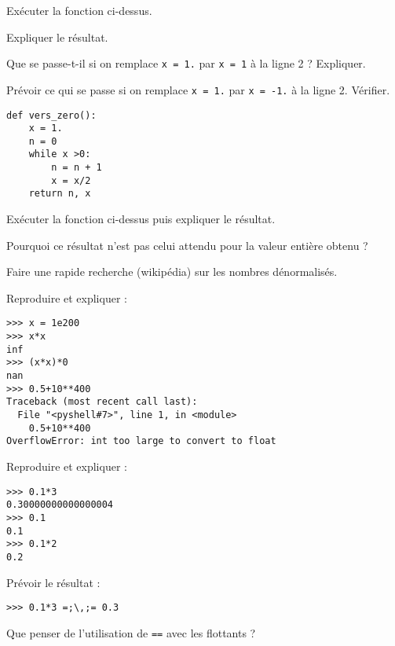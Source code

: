 Exécuter la fonction ci-dessus.

Expliquer le résultat.

Que se passe-t-il si on remplace \verb+x = 1.+ par \verb+x = 1+ à la ligne 2 ? Expliquer.

Prévoir ce qui se passe si on remplace \verb+x = 1.+ par \verb+x = -1.+ à la ligne 2. Vérifier.
\medskip


\begin{lstlisting}
def vers_zero():
    x = 1.
    n = 0
    while x >0:
        n = n + 1
        x = x/2
    return n, x

\end{lstlisting}

Exécuter la fonction ci-dessus puis expliquer le résultat. 

Pourquoi ce résultat n'est pas celui attendu pour la valeur entière obtenu ?

Faire une rapide recherche (wikipédia) sur les nombres dénormalisés. 

\eject
{}
\medskip


Reproduire et expliquer : 

\begin{lstlisting}
>>> x = 1e200
>>> x*x
inf
>>> (x*x)*0
nan
>>> 0.5+10**400
Traceback (most recent call last):
  File "<pyshell#7>", line 1, in <module>
    0.5+10**400
OverflowError: int too large to convert to float
\end{lstlisting}


\medskip

Reproduire et expliquer : 

\begin{lstlisting}
>>> 0.1*3
0.30000000000000004
>>> 0.1
0.1
>>> 0.1*2
0.2
\end{lstlisting}

Prévoir le résultat : 

\begin{lstlisting}[escapeinside =;;]
>>> 0.1*3 =;\,;= 0.3
\end{lstlisting}

Que penser de l'utilisation de \verb+==+ avec les flottants ?

\eject

\medskip

